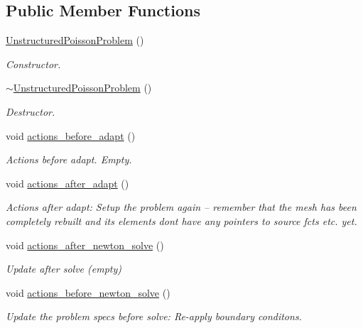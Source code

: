 \subsection*{Public Member Functions}
\begin{DoxyCompactItemize}
\item 
\hyperlink{classUnstructuredPoissonProblem_a26e7610a714aea17c9278beec4842371}{Unstructured\+Poisson\+Problem} ()
\begin{DoxyCompactList}\small\item\em Constructor. \end{DoxyCompactList}\item 
\hyperlink{classUnstructuredPoissonProblem_aeae85592e36ba7be6b4891fb49d2197b}{$\sim$\+Unstructured\+Poisson\+Problem} ()
\begin{DoxyCompactList}\small\item\em Destructor. \end{DoxyCompactList}\item 
void \hyperlink{classUnstructuredPoissonProblem_ac9627efd3c311156e5347ed37d4ea4b0}{actions\+\_\+before\+\_\+adapt} ()
\begin{DoxyCompactList}\small\item\em Actions before adapt. Empty. \end{DoxyCompactList}\item 
void \hyperlink{classUnstructuredPoissonProblem_a6f3e089824cfbb4f458efd8c8ffd376d}{actions\+\_\+after\+\_\+adapt} ()
\begin{DoxyCompactList}\small\item\em Actions after adapt\+: Setup the problem again -- remember that the mesh has been completely rebuilt and its element\textquotesingle{}s don\textquotesingle{}t have any pointers to source fcts etc. yet. \end{DoxyCompactList}\item 
void \hyperlink{classUnstructuredPoissonProblem_a822bd18e50ebeefd6d1c196fad7c0bf1}{actions\+\_\+after\+\_\+newton\+\_\+solve} ()
\begin{DoxyCompactList}\small\item\em Update after solve (empty) \end{DoxyCompactList}\item 
void \hyperlink{classUnstructuredPoissonProblem_a2ab9d23c0e6e6631ffe1a761f6bdf026}{actions\+\_\+before\+\_\+newton\+\_\+solve} ()
\begin{DoxyCompactList}\small\item\em Update the problem specs before solve\+: Re-\/apply boundary conditons. \end{DoxyCompactList}\item 

\end{DoxyCompactItemize}
